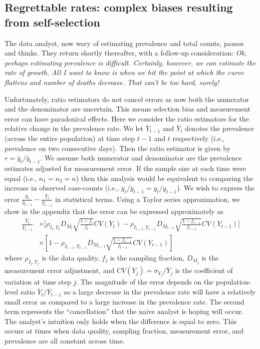\documentclass[aoas]{amsart}
\begin{document}
\subsection{Regrettable rates: complex biases resulting from self-selection}
\label{section:rates}

The data analyst, now wary of estimating prevalence and total counts, pauses and thinks.  They return shortly thereafter, with a follow-up consideration: \emph{Ok, perhaps estimating prevalence is difficult. Certainly, however, we can estimate the rate of growth.  All I want to know is when we hit the point at which the curve flattens and number of deaths decrease.  That can't be too hard, surely!}

Unfortunately, ratio estimators do not cancel errors as now both the numerator and the denominator are uncertain.  This means selection bias and measurement error can have paradoxical effects.  Here we consider the ratio estimators for the relative change in the prevalence rate.  We let $\bar Y_{t-1}$ and $\bar Y_{t}$ denotes the prevalence (across the entire population) at time step $t-1$ and $t$ respectively (i.e., prevalence on two consecutive days).  Then the ratio estimator is given by $r = \bar y_t / \bar y_{t-1}$.  We assume both numerator and denominator are the prevalence estimates adjusted for measurement error. If the sample size at each time were equal (i.e., $n_1 = n_2 = n$) then this analysis would be equivalent to comparing the increase in observed case-counts (i.e., $\bar y_t/\bar y_{t-1} = y_t/y_{t-1}$).  We wish to express the error $\frac{\bar y_t}{\bar y_{t-1}} - \frac{\bar Y_{t}}{\bar Y_{t-1}}$ in statistical terms.  Using a Taylor series approximation, we show in the appendix that the error can be expressed approximately as
$$
\begin{aligned}
\frac{\bar Y_t}{\bar Y_{t-1}} &\times \bigg[ \rho_{I_t,Y_t} D_{M_t} \sqrt{\frac{1-f_t}{f_t}} CV (Y_t)  -\rho_{I_{t-1},Y_{t-1}} D_{M_{t-1}} \sqrt{\frac{1-f_{t-1}}{f_{t-1}}} CV (Y_{t-1}) \bigg] \\
&\times \left[ 1 - \rho_{I_{t-1},Y_{t-1}} D_{M_{t-1}} \sqrt{\frac{1-f_{t-1}}{f_{t-1}}} CV (Y_{t-1}) \right]
\end{aligned}
$$
where $\rho_{I_j, Y_j}$ is the data quality, $f_j$ is the sampling fraction, $D_{M_j}$ is the measurement error adjustment, and $CV(Y_j) = \sigma_{Y_j}/\bar Y_j$ is the coefficient of variation at time step $j$.  The magnitude of the error depends on the population-level ratio $\bar Y_{t} / \bar Y_{t-1}$ so a large decrease in the prevalence rate will have a relatively small error as compared to a large increase in the prevalence rate. The second term represents the ``cancellation'' that the naive analyst is hoping will occur.  The analyst's intuition only holds when the difference is equal to zero.  This occurs at times when data quality, sampling fraction, measurement error, and prevalence are all constant across time.
\end{document}
